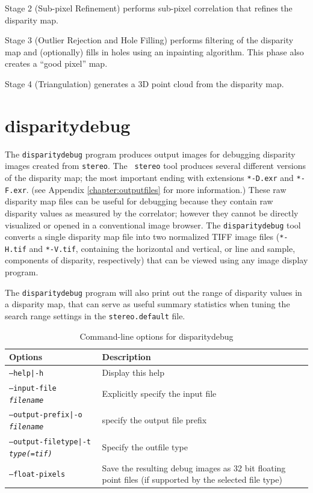 Stage 2 (Sub-pixel Refinement) performs sub-pixel correlation that
refines the disparity map.

Stage 3 (Outlier Rejection and Hole Filling) performs filtering of the
disparity map and (optionally) fills in holes using an inpainting
algorithm.  This phase also creates a ``good pixel'' map.

Stage 4 (Triangulation) generates a 3D point cloud from the disparity
map.

\section{disparitydebug}
\label{disparitydebug}

The \texttt{disparitydebug} program produces output images for
debugging disparity images created from \verb#stereo#. The {\tt
stereo} tool produces several different versions of the disparity
map; the most important ending with extensions \verb#*-D.exr# and
\verb#*-F.exr#. (see Appendix \ref{chapter:outputfiles} for more
information.)  These raw disparity map files can be useful for
debugging because they contain raw disparity values as measured by
the correlator; however they cannot be directly visualized or opened
in a conventional image browser.  The \verb#disparitydebug# tool
converts a single disparity map file into two normalized TIFF image
files (\verb#*-H.tif# and \verb#*-V.tif#, containing the horizontal
and vertical, or line and sample, components of disparity, respectively)
that can be viewed using any image display program.

The {\tt disparitydebug} program will also print out the range of
disparity values in a disparity map, that can serve as useful summary
statistics when tuning the search range settings in the
{\tt stereo.default} file.

\begin{longtable}{|l|p{10cm}|}
\caption{Command-line options for disparitydebug}
\label{tbl:disparitydebug}
\endfirsthead
\endhead
\endfoot
\endlastfoot
\hline
Options & Description \\ \hline \hline
\texttt{--help|-h} & Display this help\\ \hline
\texttt{--input-file \textit{filename}} & Explicitly specify the input file \\ \hline
\texttt{--output-prefix|-o \textit{filename}} & specify the output file prefix \\ \hline
\texttt{--output-filetype|-t \textit{type(=tif)}} & Specify the outfile type \\ \hline
\texttt{--float-pixels} & Save the resulting debug images as 32 bit floating point files (if supported by the selected file type) \\ \hline
\end{longtable}


